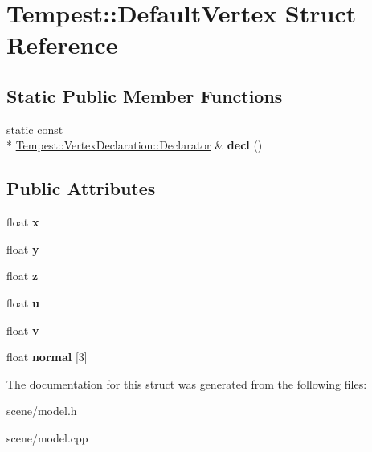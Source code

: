 \hypertarget{struct_tempest_1_1_default_vertex}{\section{Tempest\+:\+:Default\+Vertex Struct Reference}
\label{struct_tempest_1_1_default_vertex}
}
\subsection*{Static Public Member Functions}
\begin{DoxyCompactItemize}
\item 
\hypertarget{struct_tempest_1_1_default_vertex_a03a298326a87c8b21b2ea06a72f08c11}{static const \\*
\hyperlink{class_tempest_1_1_vertex_declaration_1_1_declarator}{Tempest\+::\+Vertex\+Declaration\+::\+Declarator} \& {\bfseries decl} ()}\label{struct_tempest_1_1_default_vertex_a03a298326a87c8b21b2ea06a72f08c11}

\end{DoxyCompactItemize}
\subsection*{Public Attributes}
\begin{DoxyCompactItemize}
\item 
\hypertarget{struct_tempest_1_1_default_vertex_a6c1096452227831b528435826d6504fa}{float {\bfseries x}}\label{struct_tempest_1_1_default_vertex_a6c1096452227831b528435826d6504fa}

\item 
\hypertarget{struct_tempest_1_1_default_vertex_ac210e2340b4cfc33aa6bb9bf1a3f5a7c}{float {\bfseries y}}\label{struct_tempest_1_1_default_vertex_ac210e2340b4cfc33aa6bb9bf1a3f5a7c}

\item 
\hypertarget{struct_tempest_1_1_default_vertex_aafbb820438e460f97795b61b06544734}{float {\bfseries z}}\label{struct_tempest_1_1_default_vertex_aafbb820438e460f97795b61b06544734}

\item 
\hypertarget{struct_tempest_1_1_default_vertex_a5c3453b0bdcce1a3d3df5c2e87a1f600}{float {\bfseries u}}\label{struct_tempest_1_1_default_vertex_a5c3453b0bdcce1a3d3df5c2e87a1f600}

\item 
\hypertarget{struct_tempest_1_1_default_vertex_aef4584913c4200eeb5ba513d2df19a48}{float {\bfseries v}}\label{struct_tempest_1_1_default_vertex_aef4584913c4200eeb5ba513d2df19a48}

\item 
\hypertarget{struct_tempest_1_1_default_vertex_a278b01a1f12f06738316e40d9d581654}{float {\bfseries normal} \mbox{[}3\mbox{]}}\label{struct_tempest_1_1_default_vertex_a278b01a1f12f06738316e40d9d581654}

\end{DoxyCompactItemize}


The documentation for this struct was generated from the following files\+:\begin{DoxyCompactItemize}
\item 
scene/model.\+h\item 
scene/model.\+cpp\end{DoxyCompactItemize}
